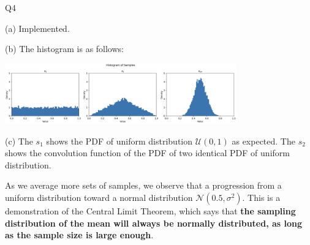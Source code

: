 \question Q4\droppoints

\begin{solution}
(a)
    Implemented.

    (b) The histogram is as follows:

    \centerline{
        \includegraphics[width=0.75\textwidth]{img/histogram}
    }

    (c) The $s_1$ shows the PDF of uniform distribution $\mathcal{U}(0, 1)$ as expected.
    The $s_2$ shows the convolution function of the PDF of two identical PDF of uniform distribution.

    As we average more sets of samples, we observe that a progression from a uniform distribution toward a normal distribution $\mathcal{N}(0.5, \sigma^2)$.
    This is a demonstration of the Central Limit Theorem, which says that \textbf{the sampling distribution of the mean will always be normally distributed, as long as the sample size is large enough}.


\end{solution}